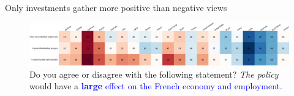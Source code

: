 \begin{frame}{Only investments gather more positive than negative views}%
	\begin{figure}[h!]
	\centering
	\caption{%
	Do you agree or disagree with the following statement? \textit{The policy} would have a \textcolor{blue}{\textbf{large} effect on the French economy and employment}.}
	\includegraphics[width=\textwidth]{../figures/country_comparison/policies_large_effect_positive_countries.png}
	\end{figure}
\end{frame}
	
	
	
	
